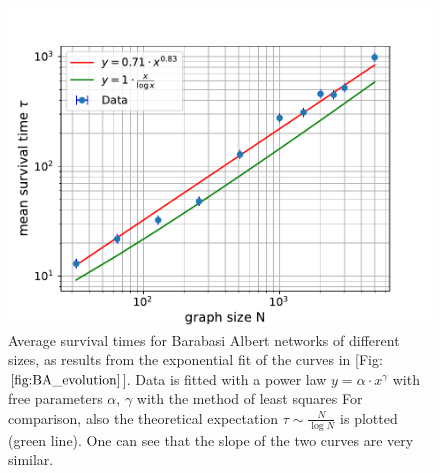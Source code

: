 \begin{figure}[H]
    \centering
    \includegraphics[width=0.7\linewidth]{latex_source/images/voter/BA_time_scaling.pdf}
    \caption{Average survival times for Barabasi Albert networks of different sizes, as results from the exponential fit of the curves in [Fig: $\ref{fig:BA_evolution}$]. Data is fitted with a power law $y = \alpha \cdot x^\gamma$ with free parameters $\alpha,\, \gamma$ with the method of least squares For comparison, also the theoretical expectation $\tau \sim \frac{N}{\log{N}}$ is plotted (green line). One can see that the slope of the two curves are very similar.}
    \label{fig:BA_scaling}
\end{figure}